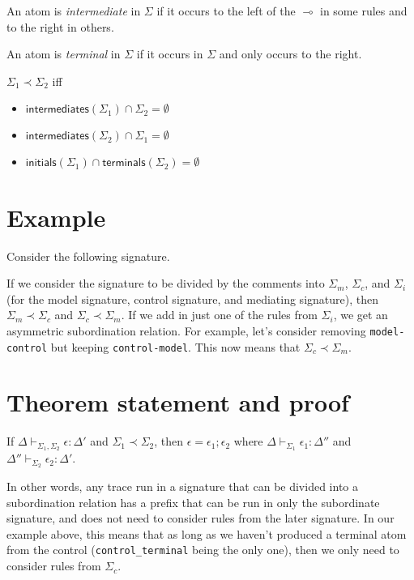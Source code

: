 \documentclass{article}
\newcommand{\lolli}{\multimap}
\newcommand{\subord}{\prec}
\newcommand{\inits}{\mathsf{initials}}
\newcommand{\interms}{\mathsf{intermediates}}
\newcommand{\terms}{\mathsf{terminals}}
\newcommand{\eps}{\epsilon}
\begin{document}
An atom is {\em intermediate} in $\Sigma$ if it occurs to the left of
the $\lolli$ in some rules and to the right in others.

An atom is {\em terminal} in $\Sigma$ if it occurs in $\Sigma$ and only
occurs to the right.

$\Sigma_1 \subord \Sigma_2$ iff

\begin{itemize}
\item $\interms(\Sigma_1) \cap \Sigma_2 = \emptyset$
\item $\interms(\Sigma_2) \cap \Sigma_1 = \emptyset$
\item $\inits(\Sigma_1) \cap \terms(\Sigma_2) = \emptyset$
\end{itemize}


\section{Example}

Consider the following signature.



If we consider the signature to be divided by the comments into $\Sigma_m$,
$\Sigma_c$, and $\Sigma_i$ (for the model signature, control signature, and
mediating signature), then $\Sigma_m \subord \Sigma_c$ and $\Sigma_c
\subord \Sigma_m$. If we add in just one of the rules from $\Sigma_i$, we
get an asymmetric subordination relation. For example, let's consider
removing \verb|model-control| but keeping \verb|control-model|. This now
means that $\Sigma_c \subord \Sigma_m$.


\section{Theorem statement and proof}

If $\Delta \vdash_{ \Sigma_1, \Sigma_2} \eps : \Delta'$
and $\Sigma_1 \subord \Sigma_2$, then
$\eps = \eps_1 ; \eps_2$ where
$\Delta \vdash_{\Sigma_1} \eps_1 : \Delta''$
and
$\Delta'' \vdash_{\Sigma_2} \eps_2 : \Delta'$.

In other words, any trace run in a signature that can be divided into a
subordination relation has a prefix that can be run in only the subordinate
signature, and does not need to consider rules from the later signature. In
our example above, this means that as long as we haven't produced a
terminal atom from the control (\verb|control_terminal| being the only
one), then we only need to consider rules from $\Sigma_c$.
\end{document}
